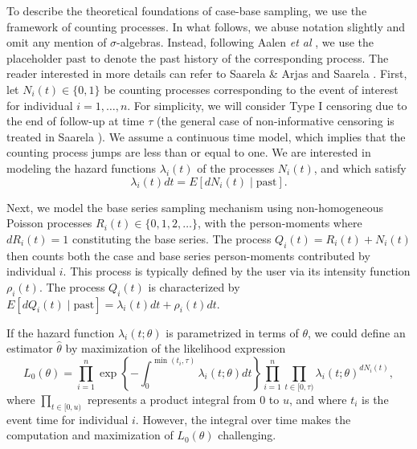 \documentclass[
]{jss}
\begin{document}
To describe the theoretical foundations of case-base sampling, we use
the framework of counting processes. In what follows, we abuse notation
slightly and omit any mention of \(\sigma\)-algebras. Instead, following
Aalen \emph{et al} \citeyearpar{aalen2008survival}, we use the
placeholder \(\mathrm{past}\) to denote the past history of the
corresponding process. The reader interested in more details can refer
to Saarela \& Arjas \citeyearpar{saarela2015non} and Saarela
\citeyearpar{saarela2016case}. First, let \(N_{i}(t) \in \{0, 1\}\) be
counting processes corresponding to the event of interest for individual
\(i=1, \ldots,n\). For simplicity, we will consider Type I censoring due
to the end of follow-up at time \(\tau\) (the general case of
non-informative censoring is treated in Saarela
\citeyearpar{saarela2016case}). We assume a continuous time model, which
implies that the counting process jumps are less than or equal to one.
We are interested in modeling the hazard functions \(\lambda_{i}(t)\) of
the processes \(N_i(t)\), and which satisfy
\[\lambda_{i}(t) dt = E[dN_{i}(t)\mid \mathrm{past}].\]

Next, we model the base series sampling mechanism using non-homogeneous
Poisson processes \(R_i(t) \in \{0, 1, 2, \ldots\}\), with the
person-moments where \(dR_i(t) = 1\) constituting the base series. The
process \(Q_{i}(t) = R_i(t) + N_{i}(t)\) then counts both the case and
base series person-moments contributed by individual \(i\). This process
is typically defined by the user via its intensity function
\(\rho_i(t)\). The process \(Q_{i}(t)\) is characterized by
\(E[dQ_{i}(t)\mid\mathrm{past}] = \lambda_{i}(t)dt + \rho_i(t)dt\).

If the hazard function \(\lambda_{i}(t; \theta)\) is parametrized in
terms of \(\theta\), we could define an estimator \(\hat{\theta}\) by
maximization of the likelihood expression
\[L_0(\theta) = \prod_{i=1}^n \exp\left\{ -\int_0^{\min(t_i,\tau)} \lambda_i(t; \theta) dt \right\} \prod_{i=1}^{n} \prod_{t\in[0,\tau)} \lambda_{i}(t;\theta)^{dN_{i}(t)},\]
where \(\prod_{t\in[0,u)}\) represents a product integral from \(0\) to
\(u\), and where \(t_i\) is the event time for individual \(i\).
However, the integral over time makes the computation and maximization
of \(L_0(\theta)\) challenging.
\end{document}
